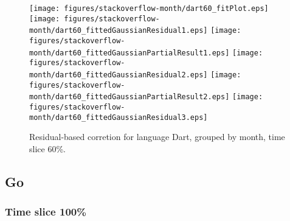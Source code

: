 \begin{figure}[t]
\centering
{}
{\texttt{[image: figures/stackoverflow-month/dart60\_fitPlot.eps]}}
{\texttt{[image: figures/stackoverflow-month/dart60\_fittedGaussianResidual1.eps]}}
{\texttt{[image: figures/stackoverflow-month/dart60\_fittedGaussianPartialResult1.eps]}}
{\texttt{[image: figures/stackoverflow-month/dart60\_fittedGaussianResidual2.eps]}}
{\texttt{[image: figures/stackoverflow-month/dart60\_fittedGaussianPartialResult2.eps]}}
{\texttt{[image: figures/stackoverflow-month/dart60\_fittedGaussianResidual3.eps]}}
\caption{Residual-based corretion for language Dart, grouped by month, time slice 60\%.}
\end{figure}


\FloatBarrier


\subsection{Go}

\subsubsection{Time slice 100\%}

